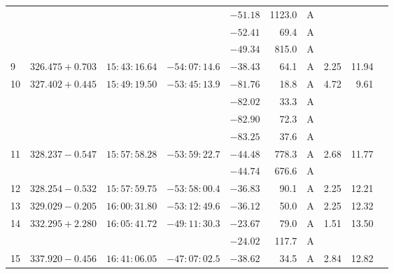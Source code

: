 {\begin{longtable}{l lll r r c rrr}
     &  $             $   &  $           $    & $           $    & $ -51.18 $ &  1123.0&       A    &          &           &           \\
     &  $             $   &  $           $    & $           $    & $ -52.41 $ &    69.4&       A    &          &           &           \\
     &  $             $   &  $           $    & $           $    & $ -49.34 $ &   815.0&       A    &          &           &           \\
9    &  $326.475+0.703$   &  $15:43:16.64$    & $-54:07:14.6$    & $ -38.43 $ &    64.1&       A    &    2.25  &   11.94   &           \\
10   &  $327.402+0.445$   &  $15:49:19.50$    & $-53:45:13.9$    & $ -81.76 $ &    18.8&       A    &    4.72  &    9.61   &           \\
     &  $             $   &  $           $    & $           $    & $ -82.02 $ &    33.3&       A    &          &           &           \\
     &  $             $   &  $           $    & $           $    & $ -82.90 $ &    72.3&       A    &          &           &           \\
     &  $             $   &  $           $    & $           $    & $ -83.25 $ &    37.6&       A    &          &           &           \\
11   &  $328.237-0.547$   &  $15:57:58.28$    & $-53:59:22.7$    & $ -44.48 $ &   778.3&       A    &    2.68  &   11.77   &           \\
     &  $             $   &  $           $    & $           $    & $ -44.74 $ &   676.6&       A    &          &           &           \\
12   &  $328.254-0.532$   &  $15:57:59.75$    & $-53:58:00.4$    & $ -36.83 $ &    90.1&       A    &    2.25  &   12.21   &           \\
13   &  $329.029-0.205$   &  $16:00:31.80$    & $-53:12:49.6$    & $ -36.12 $ &    50.0&       A    &    2.25  &   12.32   &           \\
14   &  $332.295+2.280$   &  $16:05:41.72$    & $-49:11:30.3$    & $ -23.67 $ &    79.0&       A    &    1.51  &   13.50   &           \\
     &  $             $   &  $           $    & $           $    & $ -24.02 $ &   117.7&       A    &          &           &           \\
15   &  $337.920-0.456$   &  $16:41:06.05$    & $-47:07:02.5$    & $ -38.62 $ &    34.5&       A    &    2.84  &   12.82   &           \\

\end{longtable}}
